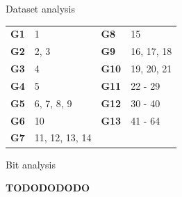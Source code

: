 \documentclass{beamer}
\begin{document}
\begin{darkframes}
\begin{frame}{Dataset analysis}
      \begin{table}[!b]
        {\carlitoTLF %
        \begin{tabularx}{\textwidth}{XXXX}
          \toprule
          \textbf{G1} & 1 & \textbf{G8} & 15 \\
          \textbf{G2} & 2, 3 & \textbf{G9} & 16, 17, 18 \\
          \textbf{G3} & 4 & \textbf{G10} & 19, 20, 21 \\
          \textbf{G4} & 5 & \textbf{G11} & 22 - 29 \\
          \textbf{G5} & 6, 7, 8, 9 & \textbf{G12} & 30 - 40 \\     
          \textbf{G6} & 10 & \textbf{G13} & 41 - 64 \\
          \textbf{G7} & 11, 12, 13, 14 & & \\
          \bottomrule
        \end{tabularx}}
      \end{table}
    \end{frame}

    \begin{frame}{Bit analysis}

     \textbf{TODODODODO}

    \end{frame}


\end{darkframes}
\end{document}
